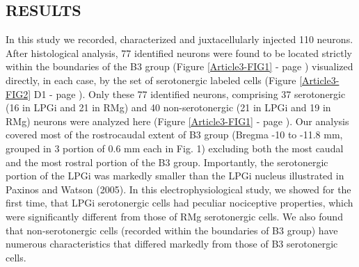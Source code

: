 \documentclass[a4paper,12pt,twoside]{report}
\begin{document}
\subsection{RESULTS}

In this study we recorded, characterized and juxtacellularly injected 110 neurons. After histological analysis, 77 identified neurons were found to be located strictly within the boundaries of the B3 group (Figure \ref{Article3-FIG1} - page \pageref{Article3-FIG1}) visualized directly, in each case, by the set of serotonergic labeled cells (Figure \ref{Article3-FIG2} D1 - page \pageref{Article3-FIG2}). Only these 77 identified neurons, comprising 37 serotonergic (16 in LPGi and 21 in RMg) and 40 non-serotonergic (21 in LPGi and 19 in RMg) neurons were analyzed here (Figure \ref{Article3-FIG1} - page \pageref{Article3-FIG1}). Our analysis covered most of the rostrocaudal extent of B3 group (Bregma -10 to -11.8 mm, grouped in 3 portion of 0.6 mm each in Fig. 1) excluding both the most caudal and the most rostral portion of the B3 group. Importantly, the serotonergic portion of the LPGi was markedly smaller than the LPGi nucleus illustrated in Paxinos and Watson (2005). In this electrophysiological study, we showed for the first time, that LPGi serotonergic cells had peculiar nociceptive properties, which were significantly different from those of RMg serotonergic cells. We also found that non-serotonergic cells (recorded within the boundaries of B3 group) have numerous characteristics that differed markedly from those of B3 serotonergic cells.
\end{document}
